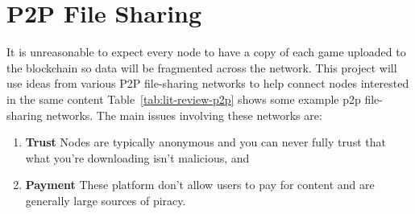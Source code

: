 
\section{P2P File Sharing}
\label{sec:lit-p2p}

It is unreasonable to expect every node to have a copy of each game uploaded to the blockchain so data will be fragmented across the network. This project will use ideas from various P2P file-sharing networks to help connect nodes interested in the same content Table~\ref{tab:lit-review-p2p} shows some example p2p file-sharing networks.
\x
The main issues involving these networks are:

\begin{enumerate}
  \item \textbf{Trust} Nodes are typically anonymous and you can never fully trust that what you're downloading isn't malicious, and
  \item \textbf{Payment} These platform don't allow users to pay for content and are generally large sources of piracy. 
\end{enumerate}


